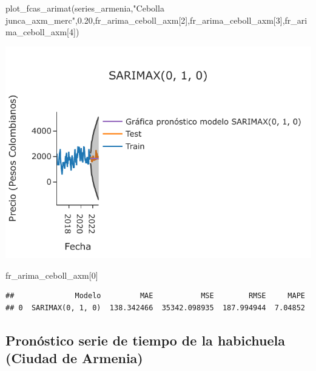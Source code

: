 \documentclass[
]{book}
\newenvironment{Shaded}{\begin{snugshade}}{\end{snugshade}}
\newcommand{\DecValTok}[1]{\textcolor[rgb]{0.00,0.00,0.81}{#1}}
\newcommand{\FloatTok}[1]{\textcolor[rgb]{0.00,0.00,0.81}{#1}}
\newcommand{\NormalTok}[1]{#1}
\newcommand{\StringTok}[1]{\textcolor[rgb]{0.31,0.60,0.02}{#1}}
\begin{document}
\begin{Shaded}
\begin{Highlighting}[]

\NormalTok{plot\_fcas\_arimat(series\_armenia,}\StringTok{"Cebolla junca\_axm\_merc"}\NormalTok{,}\FloatTok{0.20}\NormalTok{,fr\_arima\_ceboll\_axm[}\DecValTok{2}\NormalTok{],fr\_arima\_ceboll\_axm[}\DecValTok{3}\NormalTok{],fr\_arima\_ceboll\_axm[}\DecValTok{4}\NormalTok{])}
\end{Highlighting}
\end{Shaded}

\includegraphics{bookdown-demo_files/figure-latex/unnamed-chunk-152-141.pdf}

\begin{Shaded}
\begin{Highlighting}[]

\NormalTok{fr\_arima\_ceboll\_axm[}\DecValTok{0}\NormalTok{]}
\end{Highlighting}
\end{Shaded}

\begin{verbatim}
##              Modelo         MAE           MSE        RMSE     MAPE
## 0  SARIMAX(0, 1, 0)  138.342466  35342.098935  187.994944  7.04852
\end{verbatim}

\hypertarget{pronuxf3stico-serie-de-tiempo-de-la-habichuela-ciudad-de-armenia-1}{%
\subsection{Pronóstico serie de tiempo de la habichuela (Ciudad de Armenia)}\label{pronuxf3stico-serie-de-tiempo-de-la-habichuela-ciudad-de-armenia-1}}
\end{document}
